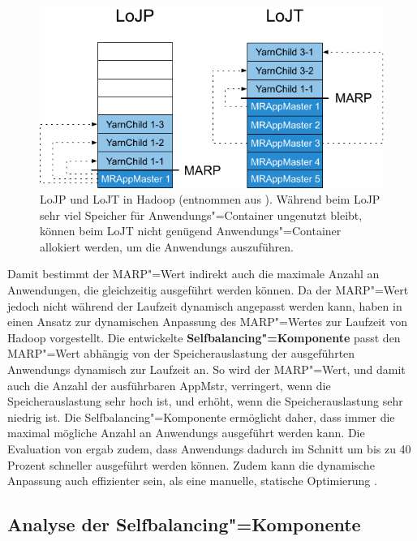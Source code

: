 \begin{figure}[h]
    \includegraphics{./resources/marpValue.pdf}
    \caption[LoJP und LoJT in Hadoop]
    {LoJP und LoJT in Hadoop (entnommen aus \cite{Zhang2016}).
        Während beim LoJP sehr viel Speicher für Anwendungs"=Container ungenutzt bleibt, können beim LoJT nicht genügend Anwendungs"=Container allokiert werden, um die \glspl{Anwendung} auszuführen.}
    \label{fig:marpValue}
\end{figure}

Damit bestimmt der \gls{MARP}"=Wert indirekt auch die maximale Anzahl an Anwendungen, die gleichzeitig ausgeführt werden können.
Da der \gls{MARP}"=Wert jedoch nicht während der Laufzeit dynamisch angepasst werden kann, haben \citeauthor{Zhang2016} in \cite{Zhang2016} einen Ansatz zur dynamischen Anpassung des \gls{MARP}"=Wertes zur Laufzeit von Hadoop vorgestellt.
Die entwickelte \textbf{Selfbalancing"=Komponente} passt den \gls{MARP}"=Wert abhängig von der Speicherauslastung der ausgeführten \glspl{Anwendung} dynamisch zur Laufzeit an.
So wird der \gls{MARP}"=Wert, und damit auch die Anzahl der ausführbaren \gls{AppMstr}, verringert, wenn die Speicherauslastung sehr hoch ist, und erhöht, wenn die Speicherauslastung sehr niedrig ist.
Die Selfbalancing"=Komponente ermöglicht daher, dass immer die maximal mögliche Anzahl an \glspl{Anwendung} ausgeführt werden kann.
Die Evaluation von \citeauthor{Zhang2016} ergab zudem, dass \glspl{Anwendung} dadurch im Schnitt um bis zu 40 Prozent schneller ausgeführt werden können.
Zudem kann die dynamische Anpassung auch effizienter sein, als eine manuelle, statische Optimierung \cite{Zhang2016}.

\subsection{Analyse der Selfbalancing"=Komponente}
\label{subsec:selfbalancingAnalysis}

